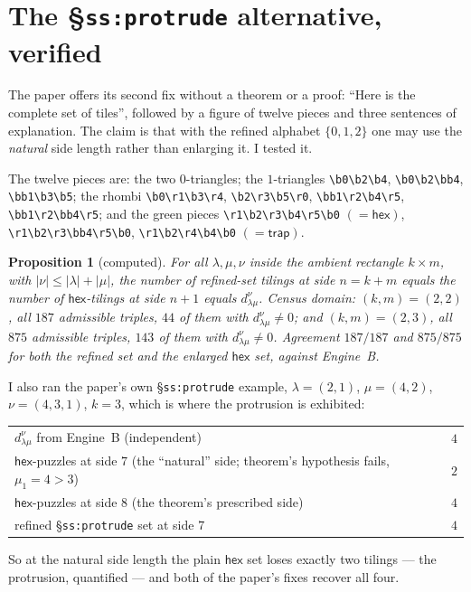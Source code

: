 \documentclass[11pt]{article}
\newtheorem{proposition}[theorem]{Proposition}
\theoremstyle{definition}
\newcommand{\hex}{\mathsf{hex}}
\newcommand{\trap}{\mathsf{trap}}
\newcommand{\la}{\lambda}
\newcommand{\dd}{d^{\nu}_{\la\mu}}
\begin{document}
\section{The \S\texttt{ss:protrude} alternative, verified}\label{sec:protrude}

The paper offers its second fix without a theorem or a proof: ``Here is the
complete set of tiles'', followed by a figure of twelve pieces and three
sentences of explanation. The claim is that with the refined alphabet
$\{0,1,2\}$ one may use the \emph{natural} side length rather than enlarging it.
I tested it.

The twelve pieces are: the two $0$-triangles; the $1$-triangles
\verb|\b0\b2\b4|, \verb|\b0\b2\bb4|, \verb|\bb1\b3\b5|; the rhombi
\verb|\b0\r1\b3\r4|, \verb|\b2\r3\b5\r0|, \verb|\bb1\r2\b4\r5|,
\verb|\bb1\r2\bb4\r5|; and the green pieces
\verb|\r1\b2\r3\b4\r5\b0| $(=\hex)$, \verb|\r1\b2\r3\bb4\r5\b0|,
\verb|\r1\b2\r4\b4\b0| $(=\trap)$.

\begin{proposition}[computed]\label{prop:protrude}
For all $\la,\mu,\nu$ inside the ambient rectangle $k\times m$, with
$|\nu|\le|\la|+|\mu|$, the number of refined-set tilings at side $n=k+m$ equals
the number of $\hex$-tilings at side $n+1$ equals $\dd$.
\emph{Census domain:} $(k,m)=(2,2)$, all $187$ admissible triples, $44$ of them
with $\dd\neq0$; and $(k,m)=(2,3)$, all $875$ admissible triples, $143$ of them
with $\dd\neq0$. Agreement $187/187$ and $875/875$ for both the refined set and
the enlarged $\hex$ set, against Engine~B.
\end{proposition}

I also ran the paper's own \S\texttt{ss:protrude} example,
$\la=(2,1)$, $\mu=(4,2)$, $\nu=(4,3,1)$, $k=3$, which is where the protrusion is
exhibited:

\begin{center}\small
\begin{tabular}{lr}
\hline
$\dd$ from Engine~B (independent) & $4$\\
$\hex$-puzzles at side $7$ (the ``natural'' side; theorem's hypothesis fails, $\mu_1=4>3$) & $2$\\
$\hex$-puzzles at side $8$ (the theorem's prescribed side) & $4$\\
refined \S\texttt{ss:protrude} set at side $7$ & $4$\\
\hline
\end{tabular}
\end{center}

\noindent
So at the natural side length the plain $\hex$ set loses exactly two tilings ---
the protrusion, quantified --- and both of the paper's fixes recover all four.
\end{document}
